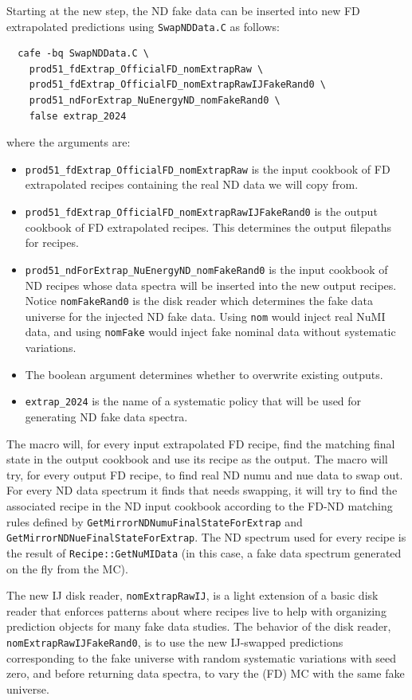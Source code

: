 \documentclass{article}
\begin{document}
Starting at the new step, the ND fake data can be inserted into new FD extrapolated predictions using \texttt{Swap\-ND\-Data\-.C} as follows:
\begin{verbatim}
  cafe -bq SwapNDData.C \
    prod51_fdExtrap_OfficialFD_nomExtrapRaw \
    prod51_fdExtrap_OfficialFD_nomExtrapRawIJFakeRand0 \
    prod51_ndForExtrap_NuEnergyND_nomFakeRand0 \
    false extrap_2024
\end{verbatim}
where the arguments are:
\begin{itemize}
  \item \texttt{prod51\_fdExtrap\_OfficialFD\_nomExtrapRaw} is the input cookbook of FD extrapolated recipes containing the real ND data we will copy from.
  \item \texttt{prod51\_fdExtrap\_OfficialFD\_nomExtrapRawIJFakeRand0} is the output cookbook of FD extrapolated recipes. This determines the output filepaths for recipes.
  \item \texttt{prod51\_ndForExtrap\_NuEnergyND\_nomFakeRand0} is the input cookbook of ND recipes whose data spectra will be inserted into the new output recipes. Notice \texttt{nom\-Fake\-Rand0} is the disk reader which determines the fake data universe for the injected ND fake data. Using \texttt{nom} would inject real NuMI data, and using \texttt{nomFake} would inject fake nominal data without systematic variations.
  \item The boolean argument determines whether to overwrite existing outputs.
  \item \texttt{extrap\_2024} is the name of a systematic policy that will be used for generating ND fake data spectra.
\end{itemize}
The macro will, for every input extrapolated FD recipe, find the matching final state in the output cookbook and use its recipe as the output. The macro will try, for every output FD recipe, to find real ND numu and nue data to swap out. For every ND data spectrum it finds that needs swapping, it will try to find the associated recipe in the ND input cookbook according to the FD-ND matching rules defined by \texttt{Get\-Mirror\-ND\-Numu\-Final\-State\-For\-Extrap} and \texttt{Get\-Mirror\-ND\-Nue\-Final\-State\-For\-Extrap}. The ND spectrum used for every recipe is the result of \texttt{Recipe::\-Get\-NuMI\-Data} (in this case, a fake data spectrum generated on the fly from the MC).

The new IJ disk reader, \texttt{nom\-Extrap\-Raw\-IJ}, is a light extension of a basic disk reader that enforces patterns about where recipes live to help with organizing prediction objects for many fake data studies.
The behavior of the disk reader, \texttt{nom\-Extrap\-Raw\-IJ\-Fake\-Rand0}, is to use the new IJ-swapped predictions corresponding to the fake universe with random systematic variations with seed zero, and before returning data spectra, to vary the (FD) MC with the same fake universe.
\end{document}
